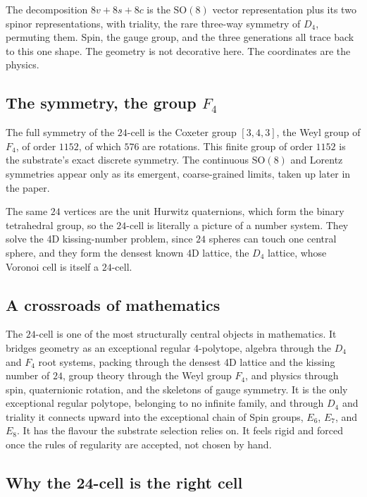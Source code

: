 The decomposition $8v + 8s + 8c$ is the $\mathrm{SO}(8)$ vector representation plus its two spinor representations, with triality, the rare three-way symmetry of $D_4$, permuting them. Spin, the gauge group, and the three generations all trace back to this one shape. The geometry is not decorative here. The coordinates are the physics.

\subsection{The symmetry, the group $F_4$}

The full symmetry of the $24$-cell is the Coxeter group $[3,4,3]$, the Weyl group of $F_4$, of order $1152$, of which $576$ are rotations. This finite group of order $1152$ is the substrate's exact discrete symmetry. The continuous $\mathrm{SO}(8)$ and Lorentz symmetries appear only as its emergent, coarse-grained limits, taken up later in the paper.

The same $24$ vertices are the unit Hurwitz quaternions, which form the binary tetrahedral group, so the $24$-cell is literally a picture of a number system. They solve the 4D kissing-number problem, since $24$ spheres can touch one central sphere, and they form the densest known 4D lattice, the $D_4$ lattice, whose Voronoi cell is itself a $24$-cell.

\subsection{A crossroads of mathematics}

The $24$-cell is one of the most structurally central objects in mathematics. It bridges geometry as an exceptional regular 4-polytope, algebra through the $D_4$ and $F_4$ root systems, packing through the densest 4D lattice and the kissing number of $24$, group theory through the Weyl group $F_4$, and physics through spin, quaternionic rotation, and the skeletons of gauge symmetry. It is the only exceptional regular polytope, belonging to no infinite family, and through $D_4$ and triality it connects upward into the exceptional chain of Spin groups, $E_6$, $E_7$, and $E_8$. It has the flavour the substrate selection relies on. It feels rigid and forced once the rules of regularity are accepted, not chosen by hand.

\subsection{Why the 24-cell is the right cell}

